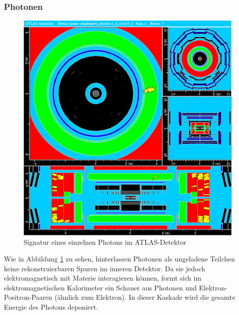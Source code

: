 \documentclass[11pt, a4paper]{article}
\numberwithin{equation}{section}
\begin{document}
\clearpage
\subsubsection{Photonen}
\begin{figure}[htbp]
	\centering
	\includegraphics[width=1.0\textwidth]{./data/atlantis/singlepart_events_new/photons/single_photon_2.png}
	\caption{Signatur eines einzelnen Photons im ATLAS-Detektor}
	\label{fig:photon}
\end{figure}
\vfill
\noindent
Wie in Abbildung \ref{fig:photon} zu sehen, hinterlassen Photonen als ungeladene Teilchen keine rekonstruierbaren Spuren im inneren Detektor.
Da sie jedoch elektromagnetisch mit Materie interagieren können, formt sich im elektromagnetischen Kalorimeter ein Schauer aus Photonen und Elektron-Positron-Paaren (ähnlich zum Elektron).
In dieser Kaskade wird die gesamte Energie des Photons deponiert.
\vfill
\end{document}
